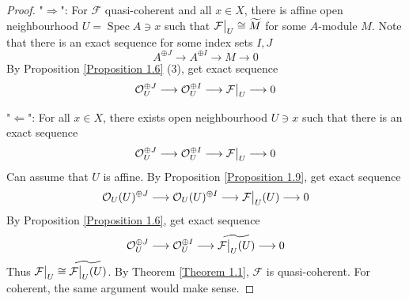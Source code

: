 \documentclass{ctexart}
\newcommand{\spec}{\operatorname{Spec}}
\begin{document}
\begin{proof}
    "$\Rightarrow$": For $\mathcal{F}$ quasi-coherent and all $x\in X$, 
    there is affine open neighbourhood $U = \spec A\ni x$ such that $\mathcal{F}\big{|}_{U} \cong \widetilde{M}$ for some $A$-module $M$.
    Note that there is an exact sequence for some index sets $I,J$
    \begin{equation}
        A^{\oplus J} \longrightarrow A^{\oplus I} \longrightarrow M \longrightarrow 0
    \end{equation}
    By Proposition \ref{Proposition 1.6} (3), get exact sequence
    \begin{equation}
        \mathcal{O}_{U}^{\oplus J} \longrightarrow \mathcal{O}_{U}^{\oplus I} \longrightarrow \mathcal{F}\big{|}_{U} \longrightarrow 0
    \end{equation}
    \par
    "$\Leftarrow$": For all $x\in X$, there exists open neighbourhood $U\ni x$ such that there is an exact sequence
    \begin{equation}
        \mathcal{O}_{U}^{\oplus J} \longrightarrow \mathcal{O}_{U}^{\oplus I} \longrightarrow \mathcal{F}\big{|}_{U} \longrightarrow 0
    \end{equation}
    Can assume that $U$ is affine.
    By Proposition \ref{Proposition 1.9}, get exact sequence
    \begin{equation}
        \mathcal{O}_{U}(U)^{\oplus J} \longrightarrow \mathcal{O}_{U}(U)^{\oplus I} \longrightarrow \mathcal{F}\big{|}_{U}(U) \longrightarrow 0
    \end{equation}
    By Proposition \ref{Proposition 1.6}, get exact sequence
    \begin{equation}
        \mathcal{O}_{U}^{\oplus J} \longrightarrow \mathcal{O}_{U}^{\oplus I} \longrightarrow \widetilde{\mathcal{F}\big{|}_{U}(U)} \longrightarrow 0
    \end{equation}
    Thus $\mathcal{F}\big{|}_{U} \cong \widetilde{\mathcal{F}\big{|}_{U}(U)}$.
    By Theorem \ref{Theorem 1.1}, $\mathcal{F}$ is quasi-coherent.
    For coherent, the same argument would make sense.
\end{proof}
\end{document}
